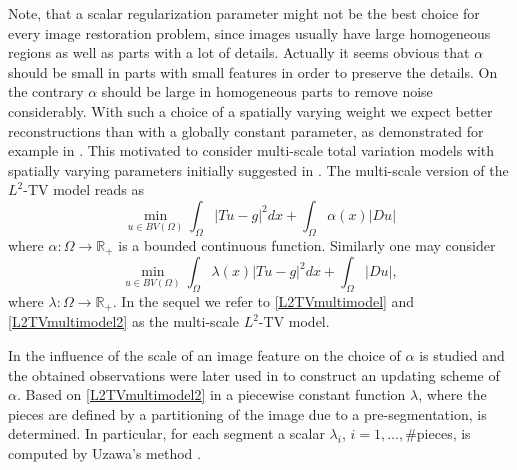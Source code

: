 \documentclass[enabledeprecatedfontcommands,cleardoublepage=empty,headsepline,twoside,11pt,DIV=15,BCOR=12mm,final]{scrartcl}
\newcommand{\R}{{\mathbb R}}
\begin{document}
Note, that a scalar regularization parameter might not be the best choice for every image restoration problem, since images usually have large homogeneous regions as well as parts with a lot of details. Actually it seems obvious that $\alpha$ should be small in parts with small features in order to preserve the details. On the contrary $\alpha$ should be large in homogeneous parts to remove noise considerably. With such a choice of a spatially varying weight we expect better reconstructions than with a globally constant parameter, as demonstrated for example in \cite{DonHinRin,HinRin}. 
 This motivated to consider multi-scale total variation models with spatially varying parameters initially suggested in \cite{RudOsh}. The multi-scale version of the $L^2$-TV model reads as
\begin{equation}\label{L2TVmultimodel}
\min_{u\in BV(\Omega)}  \int_\Omega |Tu-g|^2 dx + \int_\Omega \alpha(x) |Du|
\end{equation}
where $\alpha: \Omega \to \R_+$ is a bounded continuous function. Similarly one may consider
\begin{equation}\label{L2TVmultimodel2}
\min_{u\in BV(\Omega)} \int_\Omega \lambda(x) |Tu-g|^2 dx +  \int_\Omega |Du|,
\end{equation}
where $\lambda: \Omega \to \R_+$. In the sequel we refer to \eqref{L2TVmultimodel} and \eqref{L2TVmultimodel2} as the multi-scale $L^2$-TV model.

In \cite{StrCha1996} the influence of the scale of an image feature on the choice of $\alpha$ is studied and the obtained observations were later used in \cite{StrBloCha1997} to construct an updating scheme of $\alpha$. Based on \eqref{L2TVmultimodel2} in \cite{BerCasRouSol} a piecewise constant function $\lambda$, where the pieces are defined by a partitioning of the image due to a pre-segmentation, is determined. In particular, for each segment a scalar $\lambda_i$, $i=1,\ldots,\#$pieces, is computed by Uzawa's method \cite{Cia}.
\end{document}
